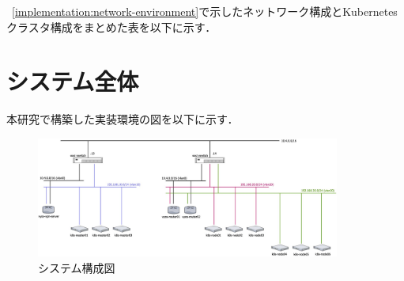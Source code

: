 ~\ref{implementation:network-environment}で示したネットワーク構成とKubernetesクラスタ構成をまとめた表を以下に示す．

\section{システム全体}
\label{implementation:system}
本研究で構築した実装環境の図を以下に示す．

\begin{figure}[htbp]
\begin{center}
\includegraphics[width=100mm]{./figures/system-diagram.jpg}
\caption{システム構成図}
\end{center}
\end{figure}

